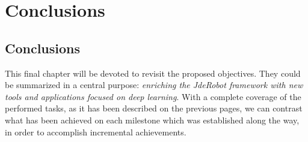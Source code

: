 \chapter{Conclusions}
\section{Conclusions}
	This final chapter will be devoted to revisit the  proposed objectives. They could be summarized in a central purpose: \emph{enriching the JdeRobot framework with new tools and applications focused on deep learning}. With a complete coverage of the performed tasks, as it has been described on the previous pages, we can contrast what has been achieved on each milestone which was established along the way, in order to accomplish incremental achievements.\\
	
